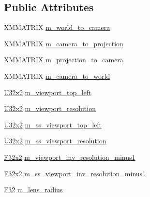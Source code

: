 \subsection*{Public Attributes}
\begin{DoxyCompactItemize}
\item 
X\+M\+M\+A\+T\+R\+IX \hyperlink{structmage_1_1rendering_1_1_camera_buffer_af1ceff883dcc383ce10f2165a5a9a061}{m\+\_\+world\+\_\+to\+\_\+camera}
\item 
X\+M\+M\+A\+T\+R\+IX \hyperlink{structmage_1_1rendering_1_1_camera_buffer_a75669aa0916514b1d414e5a2f7c72c75}{m\+\_\+camera\+\_\+to\+\_\+projection}
\item 
X\+M\+M\+A\+T\+R\+IX \hyperlink{structmage_1_1rendering_1_1_camera_buffer_a9cb9e0e4005d55b72668bbdcf4a27218}{m\+\_\+projection\+\_\+to\+\_\+camera}
\item 
X\+M\+M\+A\+T\+R\+IX \hyperlink{structmage_1_1rendering_1_1_camera_buffer_a0633cfc689f2a097783ecc1626b94590}{m\+\_\+camera\+\_\+to\+\_\+world}
\item 
\hyperlink{namespacemage_a88e05bff0300120c013285d3dcad95c5}{U32x2} \hyperlink{structmage_1_1rendering_1_1_camera_buffer_a6b0e644fb4e7dfd2f55ac4f447cddfac}{m\+\_\+viewport\+\_\+top\+\_\+left}
\item 
\hyperlink{namespacemage_a88e05bff0300120c013285d3dcad95c5}{U32x2} \hyperlink{structmage_1_1rendering_1_1_camera_buffer_a433bdb3d8b4e86fcd04fdb2b794bd0f7}{m\+\_\+viewport\+\_\+resolution}
\item 
\hyperlink{namespacemage_a88e05bff0300120c013285d3dcad95c5}{U32x2} \hyperlink{structmage_1_1rendering_1_1_camera_buffer_a9df1f7b7d6444504fcbc767171b5bfa7}{m\+\_\+ss\+\_\+viewport\+\_\+top\+\_\+left}
\item 
\hyperlink{namespacemage_a88e05bff0300120c013285d3dcad95c5}{U32x2} \hyperlink{structmage_1_1rendering_1_1_camera_buffer_a96b17352187228ee2265be33d3f2d159}{m\+\_\+ss\+\_\+viewport\+\_\+resolution}
\item 
\hyperlink{namespacemage_aa87237ad091f5cd7da612b8523fc108f}{F32x2} \hyperlink{structmage_1_1rendering_1_1_camera_buffer_a87dae6d19b7c84d361ff5304cc0fd637}{m\+\_\+viewport\+\_\+inv\+\_\+resolution\+\_\+minus1}
\item 
\hyperlink{namespacemage_aa87237ad091f5cd7da612b8523fc108f}{F32x2} \hyperlink{structmage_1_1rendering_1_1_camera_buffer_a05e17b19f87ca2a5cb5c75cf04e2796c}{m\+\_\+ss\+\_\+viewport\+\_\+inv\+\_\+resolution\+\_\+minus1}
\item 
\hyperlink{namespacemage_aa97e833b45f06d60a0a9c4fc22ae02c0}{F32} \hyperlink{structmage_1_1rendering_1_1_camera_buffer_a7915bec843e03ad2248c08b10317ccc7}{m\+\_\+lens\+\_\+radius}

\end{DoxyCompactItemize}
